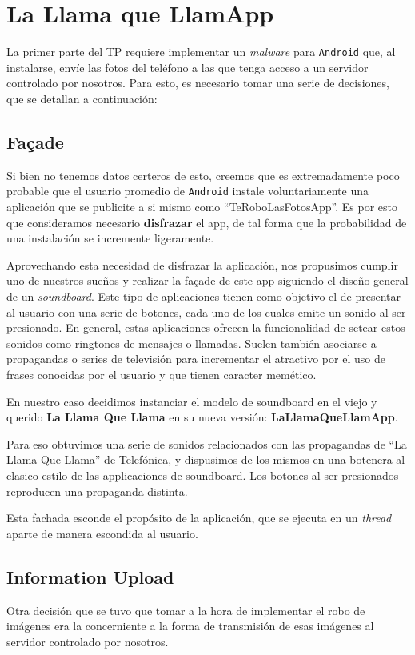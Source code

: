 \section{La Llama que LlamApp} %

La primer parte del TP requiere implementar un \emph{malware} para \texttt{Android} que, al instalarse, envíe las fotos del teléfono a las que tenga acceso a un servidor controlado por nosotros. Para esto, es necesario tomar una serie de decisiones, que se detallan a continuación:

\subsection{Façade} %
\label{sub:fa_ade}
Si bien no tenemos datos certeros de esto, creemos que es extremadamente poco probable que el usuario promedio de \texttt{Android} instale voluntariamente una aplicación que se publicite a si mismo como ``TeRoboLasFotosApp''. Es por esto que consideramos necesario \textbf{disfrazar} el app, de tal forma que la probabilidad de una instalación se incremente ligeramente.

Aprovechando esta necesidad de disfrazar la aplicación, nos propusimos cumplir uno de nuestros sueños y realizar la façade de este app siguiendo el diseño general de un \textit{soundboard}. Este tipo de aplicaciones tienen como objetivo el de presentar al usuario con una serie de botones, cada uno de los cuales emite un sonido al ser presionado. En general, estas aplicaciones ofrecen la funcionalidad de setear estos sonidos como ringtones de mensajes o llamadas. Suelen también asociarse a propagandas o series de televisión para incrementar el atractivo por el uso de frases conocidas por el usuario y que tienen caracter mem\'etico.

En nuestro caso decidimos instanciar el modelo de soundboard en el viejo y querido \textbf{La Llama Que Llama} en su nueva versión: \textbf{LaLlamaQueLlamApp}.

Para eso obtuvimos una serie de sonidos relacionados con las propagandas de ``La Llama Que Llama'' de Telefónica, y dispusimos de los mismos en una botenera al clasico estilo de las applicaciones de soundboard. Los botones al ser presionados reproducen una propaganda distinta.

Esta fachada esconde el propósito de la aplicación, que se ejecuta en un \textit{thread} aparte de manera escondida al usuario.

\subsection{Information Upload} %
\label{sub:Information Upload}
Otra decisión que se tuvo que tomar a la hora de implementar el robo de imágenes era la concerniente a la forma de transmisión de esas imágenes al servidor controlado por nosotros.

